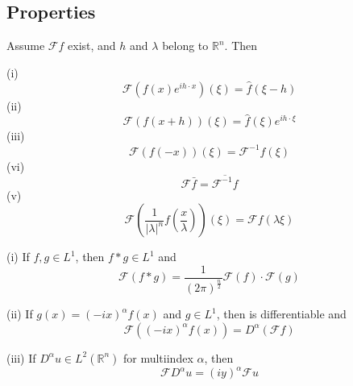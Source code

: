 \documentclass[12pt, a4paper, oneside]{book}
\begin{document}
\subsection{Properties}
\begin{theorem}
    Assume $\mathcal{F}f$ exist, and $h$ and $\lambda$ belong to $\mathbb{R}^n$. Then

    (i)
    $$
        \mathcal{F}(f(x)e^{i h \cdot x}) (\xi) = \hat{f}(\xi- h)
    $$
    (ii)
    $$\mathcal{F}(f(x+h))(\xi) = \hat{f} (\xi) e^{i h \cdot \xi}
    $$
    (iii)
    $$\mathcal{F}(f(-x)) (\xi)
        =\mathcal{F}^{-1}f (\xi)$$
    (vi)
    \begin{equation*}
        \mathcal{F}\bar{f}
        =
        \overline{\mathcal{F}^{-1}f}
    \end{equation*}
    (v)
    $$
        \mathcal{F}\left( \frac{1}{\left|\lambda\right|^n} f\left(\frac{x}{\lambda} \right)\right)(\xi)
        = \mathcal{F}f (\lambda \xi)
    $$
\end{theorem}
\begin{theorem}
    (i) If $f,g \in L^1$, then $f*g \in L^1 $ and
    $$\mathcal{F}(f*g)
        = \frac{1}{(2\pi)^\frac{n}{2}} \mathcal{F}(f) \cdot \mathcal{F}(g)$$


    (ii) If $g(x)=(-i x)^\alpha f(x)$ and $g \in L^{1}$, then is differentiable and
    $$ \mathcal{F} ((-ix)^\alpha f(x))
        =D^\alpha (\mathcal{F}f)$$

    (iii) If $D^\alpha u \in L^2(\mathbb{R}^n)$ for multiindex $\alpha$, then
    \begin{equation*}
        \mathcal{F}D^\alpha u
        =
        (iy)^\alpha \mathcal{F}u
    \end{equation*}
\end{theorem}
\end{document}
